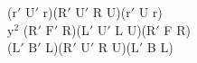 ($\text{r}'$ $\text{U}'$ r)($\text{R}'$ $\text{U}'$ R U)($\text{r}'$ U r)\\
$\text{y}^2$ ($\text{R}'$ $\text{F}'$ R)($\text{L}'$ $\text{U}'$ L U)($\text{R}'$ F R)\\
($\text{L}'$ $\text{B}'$ L)($\text{R}'$ $\text{U}'$ R U)($\text{L}'$ B L)\\
